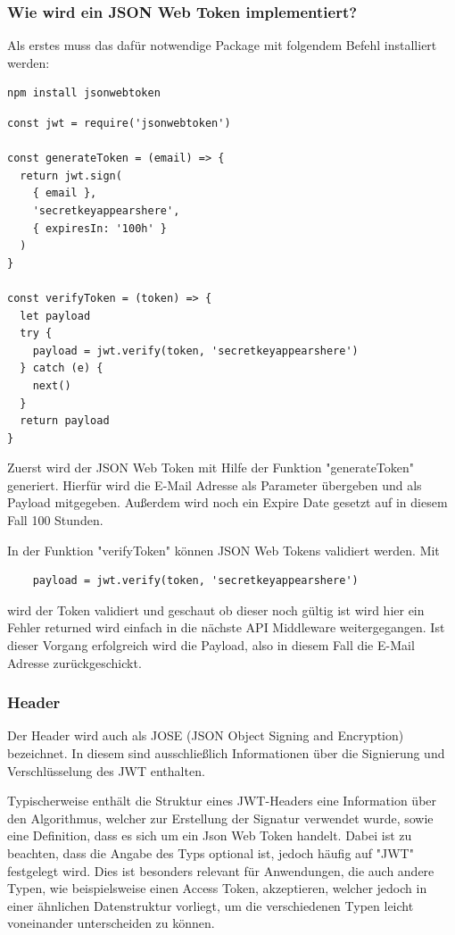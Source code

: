 \subsubsection{Wie wird ein JSON Web Token implementiert?}

Als erstes muss das dafür notwendige Package mit folgendem Befehl installiert werden:

\begin{lstlisting}
npm install jsonwebtoken
\end{lstlisting}


\begin{lstlisting}
const jwt = require('jsonwebtoken')

const generateToken = (email) => {
  return jwt.sign(
    { email },
    'secretkeyappearshere',
    { expiresIn: '100h' }
  )
}

const verifyToken = (token) => {
  let payload
  try {
    payload = jwt.verify(token, 'secretkeyappearshere')
  } catch (e) {
    next()
  }
  return payload
}
\end{lstlisting}

Zuerst wird der JSON Web Token mit Hilfe der Funktion "generateToken" generiert. Hierfür wird die E-Mail Adresse als Parameter übergeben und als Payload mitgegeben. Außerdem wird noch ein Expire Date gesetzt auf in diesem Fall 100 Stunden.

In der Funktion "verifyToken" können JSON Web Tokens validiert werden. Mit

\begin{lstlisting}
    payload = jwt.verify(token, 'secretkeyappearshere')
\end{lstlisting}

wird der Token validiert und geschaut ob dieser noch gültig ist wird hier ein Fehler returned wird einfach in die nächste API Middleware weitergegangen. Ist dieser Vorgang erfolgreich wird die Payload, also in diesem Fall die E-Mail Adresse zurückgeschickt.


\subsubsection{Header}

Der Header wird auch als JOSE (JSON Object Signing and Encryption) bezeichnet. In diesem sind ausschließlich Informationen über die Signierung und Verschlüsselung des JWT enthalten.


Typischerweise enthält die Struktur eines JWT-Headers eine Information über den Algorithmus, welcher zur Erstellung der Signatur verwendet wurde, sowie eine Definition, dass es sich um ein Json Web Token handelt. Dabei ist zu beachten, dass die Angabe des Typs optional ist, jedoch häufig auf "JWT" festgelegt wird. Dies ist besonders relevant für Anwendungen, die auch andere Typen, wie beispielsweise einen Access Token, akzeptieren, welcher jedoch in einer ähnlichen Datenstruktur vorliegt, um die verschiedenen Typen leicht voneinander unterscheiden zu können.


